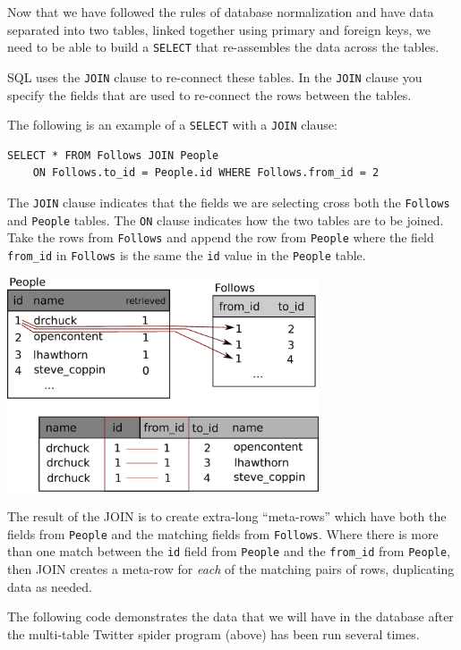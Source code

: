 \documentclass[11pt]{book}
\begin{document}
Now that we have followed the rules of database normalization
and have data separated into two tables, linked together using
primary and foreign keys, we need to be able to build a 
{\tt SELECT} that re-assembles the data across the tables.

SQL uses the {\tt JOIN} clause to re-connect these tables.  
In the {\tt JOIN} clause you specify the fields that are used 
to re-connect the rows between the tables.

The following is an example of a {\tt SELECT} with a 
{\tt JOIN} clause:

\beforeverb
\begin{verbatim}
SELECT * FROM Follows JOIN People 
    ON Follows.to_id = People.id WHERE Follows.from_id = 2
\end{verbatim}
\afterverb
%
The {\tt JOIN} clause indicates that the fields we are selecting
cross both the {\tt Follows} and {\tt People} tables.  The {\tt ON}
clause indicates how the two tables are to be joined.   Take the rows
from {\tt Follows} and append the row from {\tt People} where the
field \verb"from_id" in {\tt Follows} is the same the {\tt id} value
in the {\tt People} table.

\beforefig
\centerline{\includegraphics[height=2.50in]{figs2/join.eps}}
\afterfig

The result of the JOIN is to create extra-long ``meta-rows'' which have both 
the fields from {\tt People} and the matching fields from {\tt Follows}.
Where there is more than one match between the {\tt id} field from {\tt People}
and the \verb"from_id" from {\tt People}, then JOIN creates a meta-row 
for \emph{each} of the matching pairs of rows, duplicating data as needed.

The following code demonstrates the data that we will have in the 
database after the multi-table Twitter spider program (above) has
been run several times.
\end{document}
